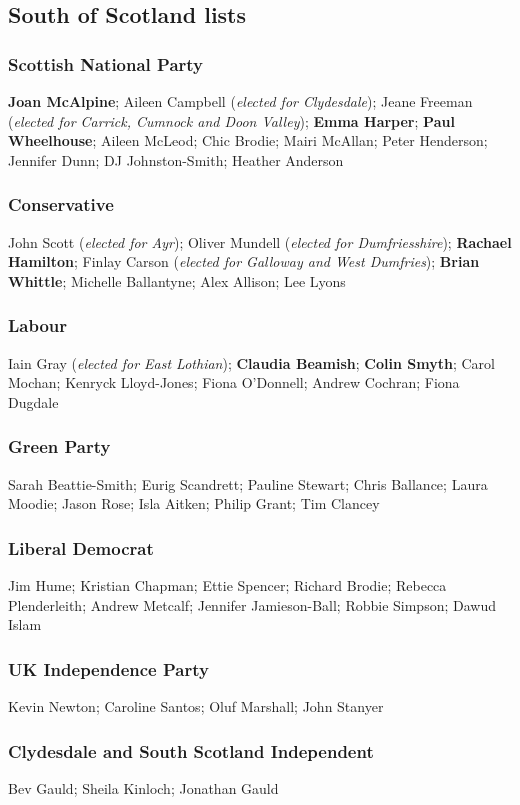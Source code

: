 \subsection*{South of Scotland lists}

\begin{resultsiii}
\subsubsection*{Scottish National Party}
\textbf{Joan McAlpine}; Aileen Campbell (\emph{elected for Clydesdale}); Jeane Freeman (\emph{elected for Carrick, Cumnock and Doon Valley}); \textbf{Emma Harper}; \textbf{Paul Wheelhouse}; Aileen McLeod; Chic Brodie; Mairi McAllan; Peter Henderson; Jennifer Dunn; DJ Johnston-Smith; Heather Anderson
\subsubsection*{Conservative}
John Scott (\emph{elected for Ayr}); Oliver Mundell (\emph{elected for Dumfriesshire}); \textbf{Rachael Hamilton}; Finlay Carson (\emph{elected for Galloway and West Dumfries}); \textbf{Brian Whittle}; Michelle Ballantyne; Alex Allison; Lee Lyons
\subsubsection*{Labour}
Iain Gray (\emph{elected for East Lothian}); \textbf{Claudia Beamish}; \textbf{Colin Smyth}; Carol Mochan; Kenryck Lloyd-Jones; Fiona O'Donnell; Andrew Cochran; Fiona Dugdale
\subsubsection*{Green Party}
Sarah Beattie-Smith; Eurig Scandrett; Pauline Stewart; Chris Ballance; Laura Moodie; Jason Rose; Isla Aitken; Philip Grant; Tim Clancey
\subsubsection*{Liberal Democrat}
Jim Hume; Kristian Chapman; Ettie Spencer; Richard Brodie; Rebecca Plenderleith; Andrew Metcalf; Jennifer Jamieson-Ball; Robbie Simpson; Dawud Islam
\subsubsection*{UK Independence Party}
Kevin Newton; Caroline Santos; Oluf Marshall; John Stanyer
\subsubsection*{Clydesdale and South Scotland Independent}
Bev Gauld; Sheila Kinloch; Jonathan Gauld

\end{resultsiii}

